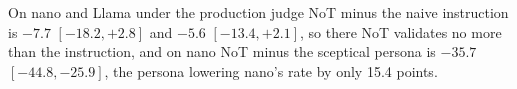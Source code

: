 On nano and Llama under the production judge NoT minus the naive
instruction is $-7.7$ $[-18.2, +2.8]$ and $-5.6$ $[-13.4, +2.1]$, so there
NoT validates no more than the instruction, and on nano NoT minus the
sceptical persona is $-35.7$ $[-44.8, -25.9]$, the persona lowering nano's
rate by only 15.4 points.

